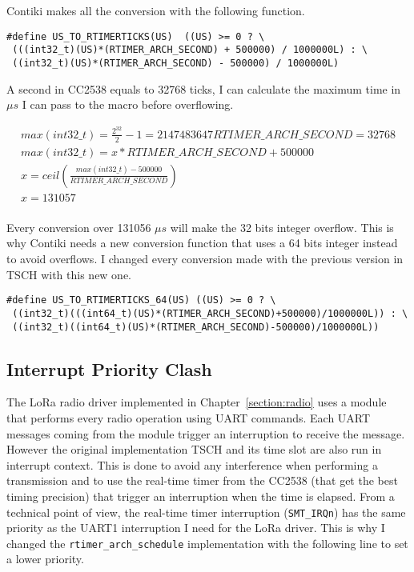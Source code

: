 Contiki makes all the conversion with the following function.

\begin{lstlisting}
#define US_TO_RTIMERTICKS(US)  ((US) >= 0 ? \
 (((int32_t)(US)*(RTIMER_ARCH_SECOND) + 500000) / 1000000L) : \
 ((int32_t)(US)*(RTIMER_ARCH_SECOND) - 500000) / 1000000L)
\end{lstlisting}

A second in CC2538 equals to 32768 ticks, I can calculate the maximum time in $\mu s$
I can pass to the macro before overflowing.

\begin{equation}
  \label{eq:maxus}
  \begin{multlined}
  max(int32\_t) = \frac{2^{32}}{2} - 1 = 2147483647
  RTIMER\_ARCH\_SECOND = 32768 \\
  max(int32\_t) = x * RTIMER\_ARCH\_SECOND + 500000 \\
  x = ceil(\frac{max(int32\_t) - 500000}{RTIMER\_ARCH\_SECOND}) \\
  x = 131057 \\
  \end{multlined}
\end{equation}

Every conversion over 131056 $\mu s$ will make the 32 bits integer overflow.
This is why Contiki needs a new conversion function that uses a 64 bits integer
instead to avoid overflows.
I changed every conversion made with the previous version in TSCH
with this new one.

\begin{lstlisting}
#define US_TO_RTIMERTICKS_64(US) ((US) >= 0 ? \
 ((int32_t)(((int64_t)(US)*(RTIMER_ARCH_SECOND)+500000)/1000000L)) : \
 ((int32_t)((int64_t)(US)*(RTIMER_ARCH_SECOND)-500000)/1000000L))
\end{lstlisting}

\subsection{Interrupt Priority Clash}

The LoRa radio driver implemented in Chapter~\ref{section:radio}
uses a module that performs every radio operation using UART commands.
Each UART messages coming from the module trigger an interruption to receive the
message.
However the original implementation TSCH and its time slot are also run in
interrupt context.
This is done to avoid any interference when performing a transmission and to
use the real-time timer from the CC2538 (that get the best timing
precision) that trigger an interruption when the time is elapsed.
From a technical point of view,
the real-time timer interruption (\lstinline{SMT_IRQn}) has the same
priority as the UART1 interruption I need for the LoRa driver.
This is why I changed the \lstinline{rtimer_arch_schedule} implementation with
the following line to set a lower priority.

